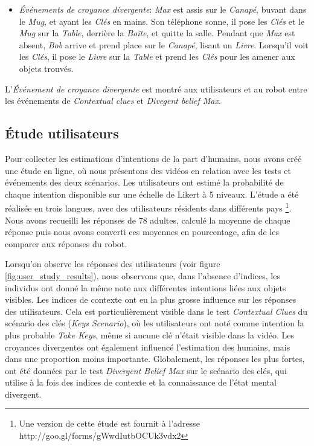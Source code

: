 \documentclass[a4paper,11pt,twoside]{StyleThese}
\begin{document}
\begin{itemize}
\item \textit{Événements de croyance divergente}: \textit{Max} est assis sur le \textit{Canapé}, buvant dans le \textit{Mug}, et ayant les \textit{Clés} en mains. Son téléphone sonne, il pose les \textit{Clés} et le \textit{Mug} sur la \textit{Table}, derrière la \textit{Boîte}, et quitte la salle. Pendant que \textit{Max} est absent, \textit{Bob} arrive et prend place sur le \textit{Canapé}, lisant un \textit{Livre}. Lorsqu'il voit les \textit{Clés}, il pose le \textit{Livre} sur la \textit{Table} et prend les \textit{Clés} pour les amener aux objets trouvés.
\end{itemize}

L'\textit{Événement de croyance divergente} est montré aux utilisateurs et au robot entre les événements de \textit{Contextual clues} et \textit{Divegent belief Max}.

\subsection{Étude utilisateurs}
Pour collecter les estimations d'intentions de la part d'humains, nous avons créé une étude en ligne, où nous présentons des vidéos en relation avec les tests et événements des deux scénarios. Les utilisateurs ont estimé la probabilité de chaque intention disponible sur une échelle de Likert à 5 niveaux. L'étude a été réalisée en trois langues, avec des utilisateurs résidents dans différents pays \footnote{Une version de cette étude est fournit à l'adresse http://goo.gl/forms/gWwdIutbOCUk3vdx2}. Nous avons recueilli les réponses de 78 adultes, calculé la moyenne de chaque réponse puis nous avons converti ces moyennes en pourcentage, afin de les comparer aux réponses du robot.

Lorsqu'on observe les réponses des utilisateurs (voir figure \ref{fig:user_study_results}), nous observons que, dans l'absence d'indices, les individus ont donné la même note aux différentes intentions liées aux objets visibles. Les indices de contexte ont eu la plus grosse influence sur les réponses des utilisateurs. Cela est particulièrement visible dans le test \textit{Contextual Clues} du scénario des clés (\textit{Keys Scenario}), où les utilisateurs ont noté comme intention la plus probable \textit{Take Keys}, même si aucune clé n'était visible dans la vidéo. Les croyances divergentes ont également influencé l'estimation des humains, mais dans une proportion moins importante. Globalement, les réponses les plus fortes, ont été données par le test \textit{Divergent Belief Max} sur le scénario des clés, qui utilise à la fois des indices de contexte et la connaissance de l'état mental divergent.
\end{document}
